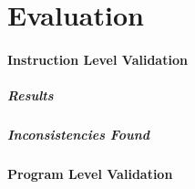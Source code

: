 \section{Evaluation} \label{sec:Eval}

\paragraph{Instruction Level Validation}

\subparagraph{Results}

\subparagraph{Inconsistencies Found} 

\paragraph{Program Level Validation}